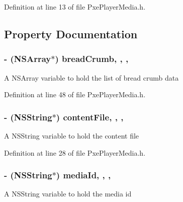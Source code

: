 Definition at line 13 of file Pxe\-Player\-Media.\-h.



\subsection{Property Documentation}
\hypertarget{interface_pxe_player_media_a9704e9a15dddf82344badf9708b1b70c}{
\subsubsection[{bread\-Crumb}]{\setlength{\rightskip}{0pt plus 5cm}-\/ (N\-S\-Array$\ast$) bread\-Crumb\hspace{0.3cm}{\ttfamily [read]}, {\ttfamily [write]}, {\ttfamily [nonatomic]}, {\ttfamily [strong]}}}\label{interface_pxe_player_media_a9704e9a15dddf82344badf9708b1b70c}
A N\-S\-Array variable to hold the list of bread crumb data 

Definition at line 48 of file Pxe\-Player\-Media.\-h.

\hypertarget{interface_pxe_player_media_ad705b8e28d0db1eef322d96b8e567c30}{
\subsubsection[{content\-File}]{\setlength{\rightskip}{0pt plus 5cm}-\/ (N\-S\-String$\ast$) content\-File\hspace{0.3cm}{\ttfamily [read]}, {\ttfamily [write]}, {\ttfamily [nonatomic]}, {\ttfamily [strong]}}}\label{interface_pxe_player_media_ad705b8e28d0db1eef322d96b8e567c30}
A N\-S\-String variable to hold the content file 

Definition at line 28 of file Pxe\-Player\-Media.\-h.

\hypertarget{interface_pxe_player_media_a718bc251d9da974b96147c52afaa33ce}{
\subsubsection[{media\-Id}]{\setlength{\rightskip}{0pt plus 5cm}-\/ (N\-S\-String$\ast$) media\-Id\hspace{0.3cm}{\ttfamily [read]}, {\ttfamily [write]}, {\ttfamily [nonatomic]}, {\ttfamily [strong]}}}\label{interface_pxe_player_media_a718bc251d9da974b96147c52afaa33ce}
A N\-S\-String variable to hold the media id 

